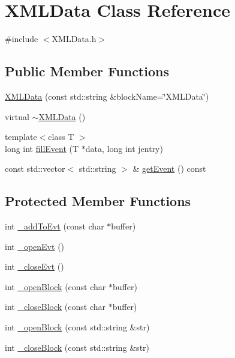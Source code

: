 \hypertarget{classXMLData}{}\section{X\+M\+L\+Data Class Reference}
\label{classXMLData}


{\ttfamily \#include $<$X\+M\+L\+Data.\+h$>$}

\subsection*{Public Member Functions}
\begin{DoxyCompactItemize}
\item 
\hyperlink{classXMLData_a3d4c884d857cd0db231b1e4295ff7646}{X\+M\+L\+Data} (const std\+::string \&block\+Name=\char`\"{}X\+M\+L\+Data\char`\"{})
\item 
virtual \hyperlink{classXMLData_ae746ab310c4b4f18a81379265191983b}{$\sim$\+X\+M\+L\+Data} ()
\item 
{\footnotesize template$<$class T $>$ }\\long int \hyperlink{classXMLData_affa7b3d998e644bfc89d1168f71fbf7d}{fill\+Event} (T $\ast$data, long int jentry)
\item 
const std\+::vector$<$ std\+::string $>$ \& \hyperlink{classXMLData_ab9c5d9f8aa1324cd6656729bc66ec6a7}{get\+Event} () const 
\end{DoxyCompactItemize}
\subsection*{Protected Member Functions}
\begin{DoxyCompactItemize}
\item 
int \hyperlink{classXMLData_a80c50c730903cf0e6ff2aa8b600beb26}{\+\_\+add\+To\+Evt} (const char $\ast$buffer)
\item 
int \hyperlink{classXMLData_a5cb05847cd0623d14534098b95b8b0c6}{\+\_\+open\+Evt} ()
\item 
int \hyperlink{classXMLData_a2b0fb567314a11f2153024452ade64b8}{\+\_\+close\+Evt} ()
\item 
int \hyperlink{classXMLData_a29719955516b4303845bdffccd10bf35}{\+\_\+open\+Block} (const char $\ast$buffer)
\item 
int \hyperlink{classXMLData_af1c0ebf8fbacf3c35104aa1356c0e7db}{\+\_\+close\+Block} (const char $\ast$buffer)
\item 
int \hyperlink{classXMLData_a6997a67e3583007ad770f21136907b57}{\+\_\+open\+Block} (const std\+::string \&str)
\item 
int \hyperlink{classXMLData_ade230a42918687179e395b15ce0663e2}{\+\_\+close\+Block} (const std\+::string \&str)
\end{DoxyCompactItemize}
